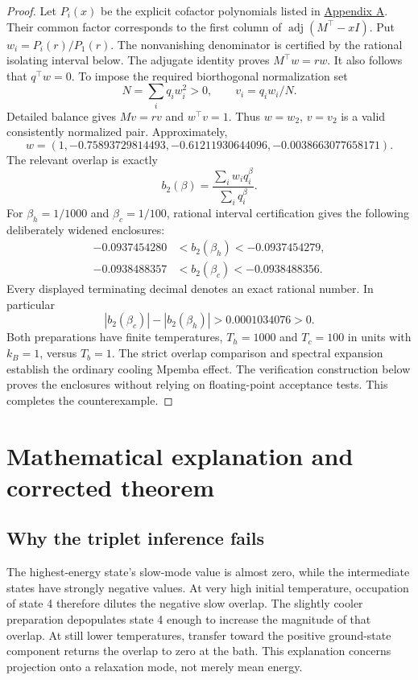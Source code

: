 \documentclass[11pt]{article}
\begin{document}
\begin{proof}
Let $P_i(x)$ be the explicit cofactor polynomials listed in \hyperref[app:cofactors]{Appendix A}. Their common factor corresponds to the first column of $\operatorname{adj}(M^\top-xI)$. Put $w_i=P_i(r)/P_1(r)$. The nonvanishing denominator is certified by the rational isolating interval below. The adjugate identity proves $M^\top w=rw$. It also follows that $q^\top w=0$. To impose the required biorthogonal normalization set
\[
N=\sum_iq_iw_i^2>0,\qquad v_i=q_iw_i/N.
\]
Detailed balance gives $Mv=rv$ and $w^\top v=1$. Thus $w=w_2$, $v=v_2$ is a valid consistently normalized pair. Approximately,
\[
w=(1,-0.75893729814493,-0.61211930644096,-0.0038663077658171).
\]
The relevant overlap is exactly
\[
b_2(\beta)=\frac{\sum_iw_iq_i^\beta}{\sum_iq_i^\beta}.
\]
For $\beta_h=1/1000$ and $\beta_c=1/100$, rational interval certification gives the following deliberately widened enclosures:
\begin{align*}
-0.0937454280&<b_2(\beta_h)<-0.0937454279,\\
-0.0938488357&<b_2(\beta_c)<-0.0938488356.
\end{align*}
Every displayed terminating decimal denotes an exact rational number. In particular
\[
|b_2(\beta_c)|-|b_2(\beta_h)|>0.0001034076>0.
\]
Both preparations have finite temperatures, $T_h=1000$ and $T_c=100$ in units with $k_B=1$, versus $T_b=1$. The strict overlap comparison and spectral expansion establish the ordinary cooling Mpemba effect. The verification construction below proves the enclosures without relying on floating-point acceptance tests. This completes the counterexample.
\end{proof}

\section{Mathematical explanation and corrected theorem}
\subsection{Why the triplet inference fails}
The highest-energy state's slow-mode value is almost zero, while the intermediate states have strongly negative values. At very high initial temperature, occupation of state 4 therefore dilutes the negative slow overlap. The slightly cooler preparation depopulates state 4 enough to increase the magnitude of that overlap. At still lower temperatures, transfer toward the positive ground-state component returns the overlap to zero at the bath. This explanation concerns projection onto a relaxation mode, not merely mean energy.
\end{document}
